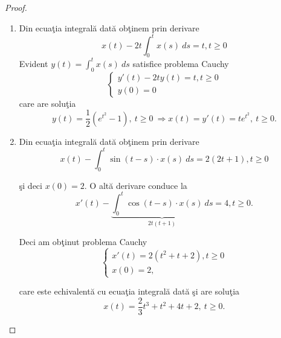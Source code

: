 \documentclass[a4paper,12pt,oneside]{report}
\begin{document}
\begin{proof}
\begin{enumerate}[label=(\alph*)]
  \item Din ecua\c{t}ia integral\u{a} dat\u{a} ob\c{t}inem prin derivare
\begin{displaymath}
x\left ( t \right ) -2t \int_{0}^{t}x\left ( s \right )\ ds = t, t\geq 0
\end{displaymath}
Evident \(y\left ( t \right ) = \int_{0}^{t}x\left ( s \right )  \ ds\) satisfice problema Cauchy
        \begin{displaymath}
        	\left\{\begin{matrix}
        	{y}'\left ( t \right ) - 2ty\left ( t \right ) = t, t\geq 0\\
        	y\left ( 0 \right ) = 0
        	\end{matrix}\right.
        \end{displaymath}
care are solu\c{t}ia
\begin{displaymath}
y\left ( t \right ) = \frac{1}{2}\left ( e^{t^{2}}- 1 \right ),~ t\geq 0~\Rightarrow x\left ( t \right )=y'(t) = te^{t^{2}},~ t\geq 0.
\end{displaymath}

  \item Din ecua\c{t}ia integral\u{a} dat\u{a} ob\c{t}inem prin derivare
        \begin{displaymath}
        	x\left ( t \right ) - \int_{0}^{t}\sin \left ( t-s \right )\cdot x\left ( s \right ) \ ds = 2\left ( 2t + 1 \right ), t\geq 0
        \end{displaymath}

        \c{s}i deci \(x\left ( 0 \right ) = 2\). O alt\u{a} derivare conduce la
        \begin{displaymath}
        	{x}'\left ( t  \right ) - \underbrace{\int_{0}^{t}\cos \left ( t-s \right ) \cdot  x\left ( s \right ) \ ds}_{2t\left ( t+1 \right )} = 4, t\geq 0.
        \end{displaymath}

        Deci am ob\c{t}inut problema Cauchy
        \begin{displaymath}
        	\left\{\begin{matrix}
        	{x}'\left ( t \right ) = 2\left ( t^{2} + t + 2 \right ), t\geq 0\\
        	x\left ( 0 \right ) = 2,
        	\end{matrix}\right.
        \end{displaymath}

        care este echivalent\u{a} cu ecua\c{t}ia integral\u{a} dat\u{a} \c{s}i are solu\c{t}ia
        \begin{displaymath}
        	x\left ( t \right ) = \frac{2}{3}t^{3} + t^{2} + 4t + 2,~ t\geq 0.
        \end{displaymath}
\end{enumerate}
\end{proof}	
\end{document}
